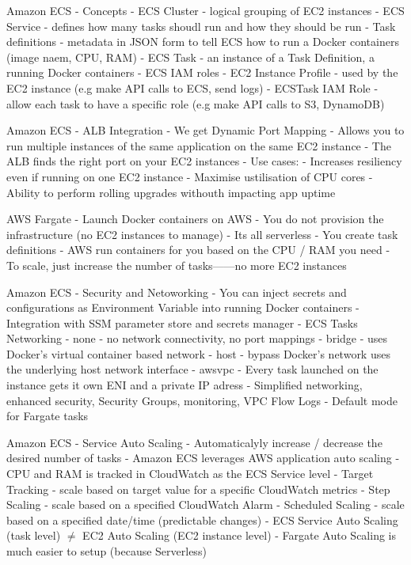 \documentclass[11pt]{book}
\begin{document}
    Amazon ECS - Concepts
    - ECS Cluster - logical grouping of EC2 instances
    - ECS Service - defines how many tasks shoudl run and how they should be run
    - Task definitions - metadata in JSON form to tell ECS how to run a Docker containers (image naem, CPU, RAM)
    - ECS Task - an instance of a Task Definition, a running Docker containers
    - ECS IAM roles
    - EC2 Instance Profile - used by the EC2 instance (e.g make API calls to ECS, send logs)
    - ECSTask IAM Role - allow each task to have a specific role (e.g make API calls to S3, DynamoDB)


    Amazon ECS - ALB Integration
    - We get Dynamic Port Mapping
    - Allows you to run multiple instances of the same application on the same EC2 instance
    - The ALB finds the right port on your EC2 instances
    - Use cases:
        - Increases resiliency even if running on one EC2 instance
        - Maximise ustilisation of CPU cores
        - Ability to perform rolling upgrades withouth impacting app uptime

    AWS Fargate
    - Launch Docker containers on AWS
    - You do not provision the infrastructure (no EC2 instances to manage)
    - Its all serverless
    - You create task definitions
    - AWS run containers for you based on the CPU / RAM you need
    - To scale, just increase the number of tasks------no more EC2 instances


    Amazon ECS - Security and Netoworking
    - You can inject secrets and configurations as Environment Variable into running Docker containers
        - Integration with SSM parameter store and secrets manager
    - ECS Tasks Networking
        - none - no network connectivity, no port mappings
        - bridge - uses Docker's virtual container based network
        - host  - bypass Docker's network uses the underlying host network interface
        - awsvpc
            - Every task launched on the instance gets it own ENI and a private IP adress
            - Simplified networking, enhanced security, Security Groups, monitoring, VPC Flow Logs
            - Default mode for Fargate tasks

    Amazon ECS - Service Auto Scaling
    - Automaticalyly  increase / decrease the desired number of tasks
    - Amazon ECS leverages AWS application auto scaling
    - CPU and RAM is tracked in CloudWatch as the ECS Service level
    - Target Tracking - scale based on target value for a specific CloudWatch metrics
    - Step Scaling - scale based on a specified CloudWatch Alarm
    - Scheduled Scaling - scale based on a specified date/time (predictable changes)
    - ECS Service Auto Scaling (task level) \( \neq \) EC2 Auto Scaling (EC2 instance level)
    - Fargate Auto Scaling is much easier to setup (because Serverless)
\end{document}

